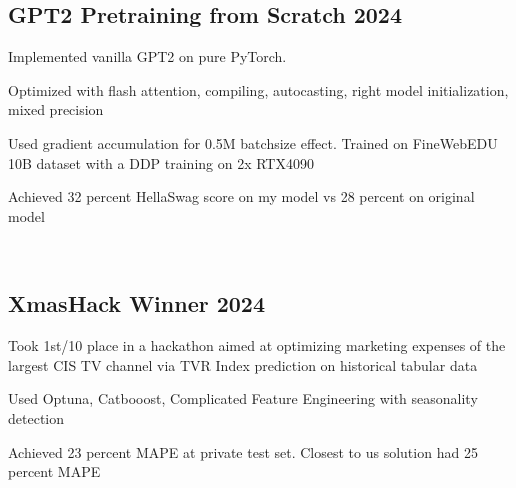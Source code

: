 \documentclass[a4paper, 12pt]{article}
\begin{document}
\vspace*{5pt}
\subsection {{GPT2 Pretraining from Scratch} \hfill 2024}
\begin{zitemize}
\item Implemented vanilla GPT2  on pure PyTorch. 
\item Optimized with flash attention, compiling, autocasting, right model initialization, mixed precision
\item Used gradient accumulation for 0.5M batchsize effect. Trained on FineWebEDU 10B dataset with a DDP training on 2x RTX4090
\item Achieved 32 percent HellaSwag score on my model vs 28 percent on original model
\end{zitemize}

\vspace*{5pt}
\
\subsection {{XmasHack Winner \hfill 2024}}
\begin{zitemize}
\item Took 1st/10 place in a hackathon aimed at optimizing marketing expenses of the largest CIS TV channel via TVR Index prediction on historical tabular data
\item Used Optuna, Catbooost, Complicated Feature Engineering with seasonality detection
\item Achieved 23 percent MAPE at private test set. Closest to us solution had 25 percent MAPE
\end{zitemize}
\end{document}
